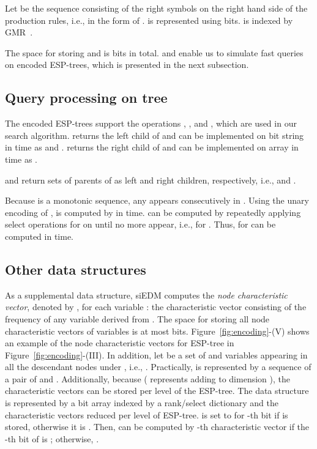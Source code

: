 \documentclass[12pt,a4paper]{scrartcl}
\begin{document}
Let  be the sequence consisting of the right symbols on the right
hand side of the production rules, i.e.,  in the form of
.   is represented using
 bits.  is indexed by
GMR~\cite{Golynski06}.

The space for storing  and  is
 bits in
total.   and  enable us to simulate fast queries on encoded
ESP-trees, which is presented in the next subsection.

\subsection{Query processing on tree}

The encoded ESP-trees support the operations
, , 
and , which are used in our search algorithm.
 returns the left child  of 
and can be implemented on bit string  in  time as
 and .
 returns the right child  of
 and can be implemented on array  in
 time as .

 and  return
sets of parents of  as left and right children, respectively,
i.e.,
 and
.  

Because  is a monotonic sequence, any  appears consecutively in .
Using the unary encoding of ,  is computed by
 in  time.  
 can be computed by repeatedly applying select operations for  on
 until no more  appear, i.e.,  for .  
Thus,  for  can be computed in  time.

\subsection{Other data structures}

As a supplemental data structure, siEDM computes the \emph{node
  characteristic vector}, denoted by , for each variable
: the characteristic vector consisting of the frequency of any
variable derived from .  The space for storing all node
characteristic vectors of  variables is at most  bits.
Figure~\ref{fig:encoding}-(V) shows an example of the node
characteristic vectors for ESP-tree in
Figure~\ref{fig:encoding}-(III).  In addition, let  be a set
of  and variables appearing in all the descendant nodes under
, i.e., .
Practically,  is represented by a sequence of a pair of
 and .  Additionally, because
 ( represents adding  to dimension ), the
characteristic vectors can be stored per level  of the
ESP-tree. The data structure is represented by a bit array 
indexed by a rank/select dictionary and the characteristic vectors
reduced per level  of ESP-tree.  is set to  for -th bit
if  is stored, otherwise it is .  Then,  can be
computed by -th characteristic vector if the -th bit
of  is ; otherwise,
.
\end{document}
